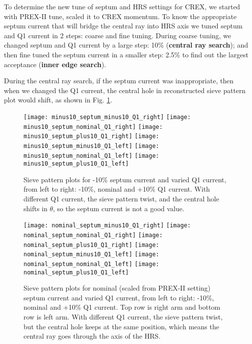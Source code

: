 To determine the new tune of septum and HRS settings for CREX, we started with 
PREX-II tune, scaled it to CREX momentum. To know the appropriate septum 
current that will bridge the central ray into HRS axis we tuned septum and 
Q1 current in 2 steps: coarse and fine tuning. During coarse tuning, we
changed septum and Q1 current by a large step: 10\% (\textbf{central ray search});
and then fine tuned the septum current in a smaller step: 2.5\% to find out
the largest acceptance (\textbf{inner edge search}).

During the central ray search, if the septum current was inappropriate, 
then when we changed the Q1 current, the central hole in reconstructed sieve 
pattern plot would shift, as shown in Fig. \ref{fig:central_ray_0}.
\begin{figure}[H]
    \centering
    \texttt{[image: minus10\_septum\_minus10\_Q1\_right]}
    \texttt{[image: minus10\_septum\_nominal\_Q1\_right]}
    \texttt{[image: minus10\_septum\_plus10\_Q1\_right]}
    \texttt{[image: minus10\_septum\_minus10\_Q1\_left]}
    \texttt{[image: minus10\_septum\_nominal\_Q1\_left]}
    \texttt{[image: minus10\_septum\_plus10\_Q1\_left]}
    \caption{Sieve pattern plots for -10\% septum current
    and varied Q1 current, from left to right: -10\%, nominal and +10\% Q1 current.
    With different Q1 current, the sieve pattern twist, and the central hole 
    shifts in $\theta$, so the septum current is not a good value.}
    \label{fig:central_ray_0}
\end{figure}

\begin{figure}[H]
    \centering
    \texttt{[image: nominal\_septum\_minus10\_Q1\_right]}
    \texttt{[image: nominal\_septum\_nominal\_Q1\_right]}
    \texttt{[image: nominal\_septum\_plus10\_Q1\_right]}
    \texttt{[image: nominal\_septum\_minus10\_Q1\_left]}
    \texttt{[image: nominal\_septum\_nominal\_Q1\_left]}
    \texttt{[image: nominal\_septum\_plus10\_Q1\_left]}
    \caption{Sieve pattern plots for nominal (scaled from PREX-II setting) septum current
    and varied Q1 current, from left to right: -10\%, nominal and +10\% Q1 current.
    Top row is right arm and bottom row is left arm. With different Q1 current,
    the sieve pattern twist, but the central hole keeps at the same position, 
    which means the central ray goes through the axis of the HRS.}
    \label{fig:central_ray_1}
\end{figure}

